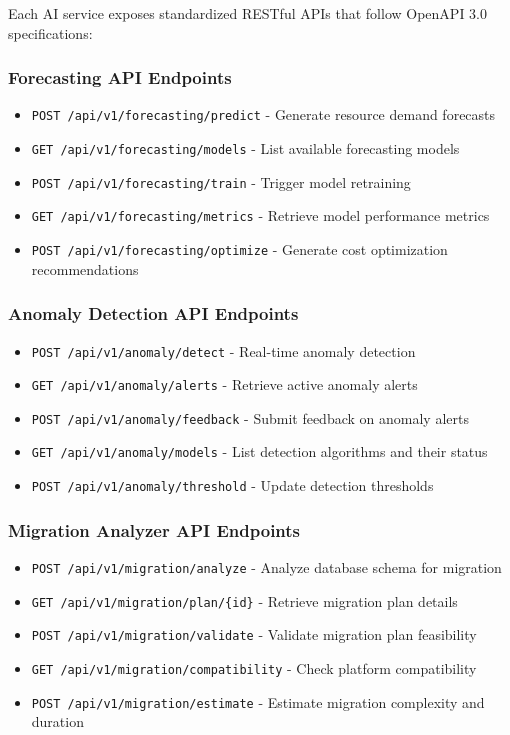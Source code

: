 Each AI service exposes standardized RESTful APIs that follow OpenAPI 3.0 specifications:

\subsubsection{Forecasting API Endpoints}

\begin{itemize}
    \item \texttt{POST /api/v1/forecasting/predict} - Generate resource demand forecasts
    \item \texttt{GET /api/v1/forecasting/models} - List available forecasting models
    \item \texttt{POST /api/v1/forecasting/train} - Trigger model retraining
    \item \texttt{GET /api/v1/forecasting/metrics} - Retrieve model performance metrics
    \item \texttt{POST /api/v1/forecasting/optimize} - Generate cost optimization recommendations
\end{itemize}

\subsubsection{Anomaly Detection API Endpoints}

\begin{itemize}
    \item \texttt{POST /api/v1/anomaly/detect} - Real-time anomaly detection
    \item \texttt{GET /api/v1/anomaly/alerts} - Retrieve active anomaly alerts
    \item \texttt{POST /api/v1/anomaly/feedback} - Submit feedback on anomaly alerts
    \item \texttt{GET /api/v1/anomaly/models} - List detection algorithms and their status
    \item \texttt{POST /api/v1/anomaly/threshold} - Update detection thresholds
\end{itemize}

\subsubsection{Migration Analyzer API Endpoints}

\begin{itemize}
    \item \texttt{POST /api/v1/migration/analyze} - Analyze database schema for migration
    \item \texttt{GET /api/v1/migration/plan/\{id\}} - Retrieve migration plan details
    \item \texttt{POST /api/v1/migration/validate} - Validate migration plan feasibility
    \item \texttt{GET /api/v1/migration/compatibility} - Check platform compatibility
    \item \texttt{POST /api/v1/migration/estimate} - Estimate migration complexity and duration
\end{itemize}

